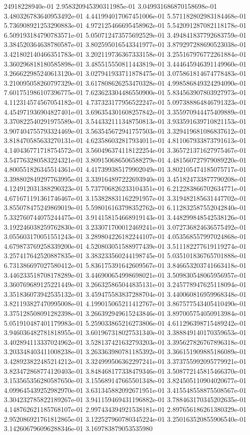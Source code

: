 24918228940e-01	2.958320945390311985e-01	3.049931686870158698e-01	3.480326783640953492e-01	4.441994017067451006e-01	5.571182802983184468e-01	5.736908921253290883e-01	4.972125466695458962e-01	5.542091287082118178e-01	6.509193184790783571e-01	5.050712473575692529e-01	3.494841837792683759e-01	3.384520364638780587e-01	3.802595016543341977e-01	3.879297288690523038e-01	3.421802140466351783e-01	3.202119736367333158e-01	3.255167976772261884e-01	3.360296818180585898e-01	3.485515550811443819e-01	3.444645946391149960e-01	3.266622985240613120e-01	3.027941933711878475e-01	3.075861814674778483e-01	3.210095058260797329e-01	3.617808626253470328e-01	4.998586849324294090e-01	7.601751986107396775e-01	7.623623304486550900e-01	5.834563907803927973e-01	4.112314574567054182e-01	4.737323177956522247e-01	5.097388864846791323e-01	4.454971936904827401e-01	3.696354301608257842e-01	3.355970944475409889e-01	3.370822540291975589e-01	3.544332111348750813e-01	3.933591639710821153e-01	3.907404755793324469e-01	3.563545672941757503e-01	3.329419681086837612e-01	3.818470585633270131e-01	4.623586032817934011e-01	4.811067933873791613e-01	4.140436771718754572e-01	3.560496374118122254e-01	3.365721371627975467e-01	3.547763280583224321e-01	3.809150686506588279e-01	4.481560727979089220e-01	4.800551826345514361e-01	4.417399385179902049e-01	3.802105474185075717e-01	3.398802849297763995e-01	3.339164897222693940e-01	3.451824733877790208e-01	4.124912031388290323e-01	5.737706826233104351e-01	6.212283866702634771e-01	4.671671191361746467e-01	3.153828831162291957e-01	3.319482185631447702e-01	3.855078475249869019e-01	5.598016163798352762e-01	6.112832587552042840e-01	5.332760744075244475e-01	3.914158154668919143e-01	3.448299848542538126e-01	3.192246038259762830e-01	3.233071700012469241e-01	3.072736824636575492e-01	3.055603170051551243e-01	3.289804226182244107e-01	4.053568557997024868e-01	4.679873769258339200e-01	4.520803051588977439e-01	3.511182277619119274e-01	3.257417642520887835e-01	3.383233560244198745e-01	5.035101836765701888e-01	6.731386697027580412e-01	5.836175391642609567e-01	3.846653203741663418e-01	3.446233518708178289e-01	3.446900654998698021e-01	3.509830548065956957e-01	3.360769689125221449e-01	3.266325865044835131e-01	3.245778947625118094e-01	3.351836073942535132e-01	3.459475583837288704e-01	3.440060816959968348e-01	3.821193827470995008e-01	4.199015065211412767e-01	3.867577543405410490e-01	3.375128508091282398e-01	3.266392949615243846e-01	3.897005754050913984e-01	5.051910487401179983e-01	5.259033865216273806e-01	4.611296398715489242e-01	3.946036482781818955e-01	3.601967318027531340e-01	3.388849140170359653e-01	3.402894113337024962e-01	3.528137421632793203e-01	3.395627826767896318e-01	3.203348403411008238e-01	3.263363980781185392e-01	3.366151909885186089e-01	3.428923822485214212e-01	3.324999506362297241e-01	3.373755992095779921e-01	3.823472868774120403e-01	3.848468177338479346e-01	3.508772145815466370e-01	3.153565356280587650e-01	3.155689147665501348e-01	3.824505110904020677e-01	4.099645439252982970e-01	3.631345882092671951e-01	3.415548558875508567e-01	3.304232785822189267e-01	3.941159469431196882e-01	3.788463170345202635e-01	4.148762621185768107e-01	2.997434394921538181e-01	2.897656186261380329e-01	2.952086921761812865e-01	3.122527960780345224e-01	3.250163520855906540e-01	3.142606796096288346e-01	3.169783879053535980